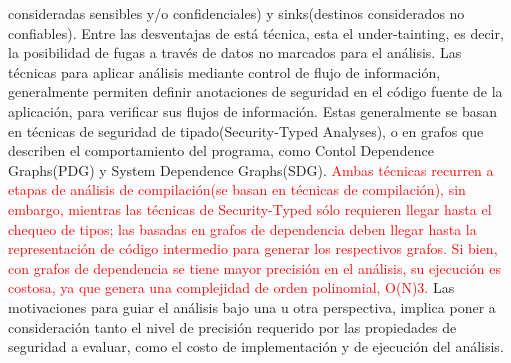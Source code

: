 consideradas sensibles y/o confidenciales) y sinks(destinos considerados no
confiables). Entre las desventajas de está técnica, esta el under-tainting, es
decir, la posibilidad de fugas a través de datos no marcados para el
análisis.\newline
Las técnicas para aplicar análisis mediante control de flujo de información,
generalmente permiten definir anotaciones de seguridad en el código fuente de la
aplicación, para verificar sus flujos de información. Estas generalmente se 
basan en técnicas de seguridad de tipado(Security-Typed Analyses), o en grafos
que describen el comportamiento del programa, como Contol Dependence Graphs(PDG)
y System Dependence Graphs(SDG).
\textcolor{red}{
Ambas técnicas recurren a etapas de análisis de compilación(se basan en
técnicas de compilación), sin embargo, mientras las técnicas de Security-Typed
sólo requieren llegar hasta el chequeo de tipos; las basadas en grafos de
dependencia deben llegar hasta la representación de código intermedio para
generar los respectivos grafos. Si bien, con grafos de dependencia se tiene
mayor precisión en el análisis, su ejecución es costosa, ya que genera una
complejidad de orden polinomial, O(N)3\cite[page 3]{FCO-PDG}.}
Las motivaciones para guiar el análisis bajo una u otra perspectiva, implica
poner a consideración tanto el nivel de precisión requerido por las propiedades
de seguridad a evaluar, como el costo de implementación y de ejecución del
análisis. \newline


 

% 
	
